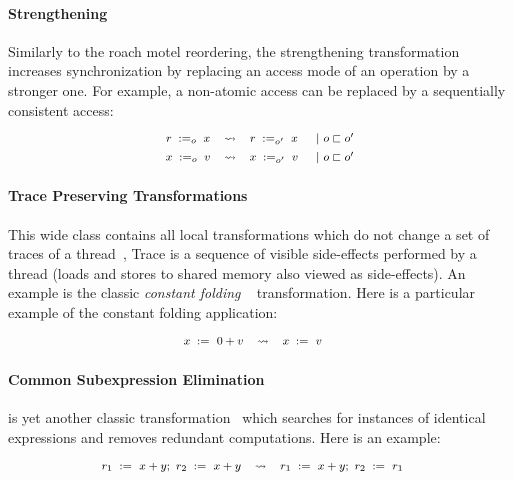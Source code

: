 \paragraph{Strengthening}

Similarly to the roach motel reordering, the strengthening
transformation increases synchronization by 
replacing an access mode of an operation by a stronger one. 
For example, a non-atomic access can be replaced by 
a sequentially consistent access: 
%
\[\def\arraystretch{1.4}\footnotesize
  \begin{array}{cccl} 

      \readInst{o}{r}{x} 
    & \leadsto 
    & \readInst{o'}{r}{x}
    & ~|~ o \sqsubset o' \\ 

      \writeInst{o}{x}{v}
    & \leadsto 
    & \writeInst{o'}{x}{v}
    & ~|~ o \sqsubset o'  \\ 

  \end{array}
\]

\paragraph{Trace Preserving Transformations}

This wide class contains all local transformations 
which do not change a set of traces of a thread~\cite{Sevcik-Aspinall:ECOOP08},
Trace is a sequence of visible side-effects performed by a thread
(loads and stores to shared memory also viewed as side-effects). 
An example is the classic \emph{constant folding}%
~\cite{Muchnick:ACDI97, Wegman-Zadeck:TOPLAS91} transformation.
Here is a particular example of the constant folding application:
%
\[\def\arraystretch{1.4}\footnotesize
  \begin{array}{cccl} 

      \writeInst{}{x}{0 + v} 
    & \leadsto 
    & \writeInst{}{x}{v}
    & \\ 

  \end{array}
\]
  
\paragraph{Common Subexpression Elimination}

\CSE is yet another classic transformation~\cite{Muchnick:ACDI97} 
which searches for instances of identical expressions 
and removes redundant computations. 
Here is an example: 
%
\[\def\arraystretch{1.4}\footnotesize
  \begin{array}{cccl} 

      \readInst{}{r_1}{x + y} \seq \readInst{}{r_2}{x + y} 
    & \leadsto 
    & \readInst{}{r_1}{x + y} \seq \readInst{}{r_2}{r_1}
    & \\ 

  \end{array}
\]


